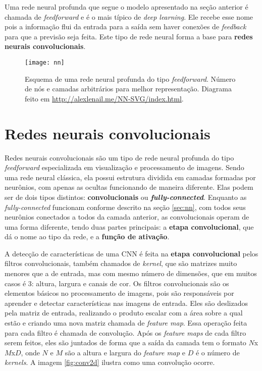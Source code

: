 Uma rede neural profunda que segue o modelo apresentado na seção anterior é chamada de \textit{feedforward} e é o mais típico de \textit{deep learning}.
Ele recebe esse nome pois a informação flui da entrada para a saída sem haver conexões de \textit{feedback} para que a previsão seja feita.
Este tipo de rede neural forma a base para \textbf{redes neurais convolucionais}.%

\begin{figure}[h!]
\texttt{[image: nn]}
\centering
\caption{Esquema de uma rede neural profunda do tipo \textit{feedforward}. Número de nós e camadas arbitrários para melhor representação. Diagrama feito em \url{http://alexlenail.me/NN-SVG/index.html}.}
\end{figure}


\section{Redes neurais convolucionais}
\label{sec:cnn}

Redes neurais convolucionais são um tipo de rede neural profunda do tipo \textit{feedforward} especializada em visualização e processamento de imagens.
Sendo uma rede neural clássica, ela possui estrutura dividida em camadas formadas por neurônios, com apenas as ocultas funcionando de maneira diferente.
Elas podem ser de dois tipos distintos:
\textbf{convolucionais} ou \textbf{\textit{fully-connected}}.
Enquanto as \textit{fully-connected} funcionam conforme descrito na seção \ref{sec:nn}, com todos seus neurônios conectados a todos da camada anterior, as convolucionais operam de uma forma diferente, tendo duas partes principais:
a \textbf{etapa convolucional}, que dá o nome ao tipo da rede,
e a \textbf{função de ativação}.

A detecção de características de uma CNN é feita na \textbf{etapa convolucional} pelos filtros convolucionais, também chamados de \textit{kernel}, que são matrizes muito menores que a de entrada, mas com mesmo número de dimensões, que em muitos casos é 3: altura, largura e canais de cor.
Os filtros convolucionais são os elementos básicos no processamento de imagens, pois são responsáveis por aprender e detectar características nas imagens de entrada.
Eles são deslizados pela matriz de entrada, realizando o produto escalar com a área sobre a qual estão e criando uma nova matriz chamada de \textit{feature map}.
Essa operação feita para cada filtro é chamada de convolução.
Após os \textit{feature maps} de cada filtro serem feitos, eles são juntados de forma que a saída da camada tem o formato $N$x$M$x$D$, onde $N$ e $M$ são a altura e largura do \textit{feature map} e $D$ é o número de \textit{kernels}.
A imagem \ref{fig:conv2d} ilustra como uma convolução ocorre.

